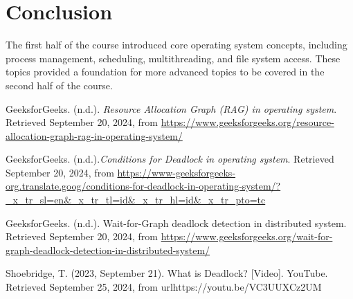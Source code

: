 \documentclass[12pt]{article}
\begin{document}
\section{Conclusion}
The first half of the course introduced core operating system concepts, including process management, scheduling, multithreading, and file system access. These topics provided a foundation for more advanced topics to be covered in the second half of the course.

\begin{thebibliography}{9}
    GeeksforGeeks. (n.d.). \textit{Resource Allocation Graph (RAG) in operating system}. Retrieved September 20, 2024, from \url{https://www.geeksforgeeks.org/resource-allocation-graph-rag-in-operating-system/}

    GeeksforGeeks. (n.d.).\textit{Conditions for Deadlock in operating system}. Retrieved September 20, 2024, from \url{https://www-geeksforgeeks-org.translate.goog/conditions-for-deadlock-in-operating-system/?_x_tr_sl=en&_x_tr_tl=id&_x_tr_hl=id&_x_tr_pto=tc}

    GeeksforGeeks. (n.d.). Wait-for-Graph deadlock detection in distributed system. Retrieved September 20, 2024, from \url{https://www.geeksforgeeks.org/wait-for-graph-deadlock-detection-in-distributed-system/}

    \bibitem{}
    Shoebridge, T. (2023, September 21). What is Deadlock? [Video]. YouTube. Retrieved September 25, 2024, from url{https://youtu.be/VC3UUXCz2UM}

    
\end{thebibliography}

    
\end{document}
